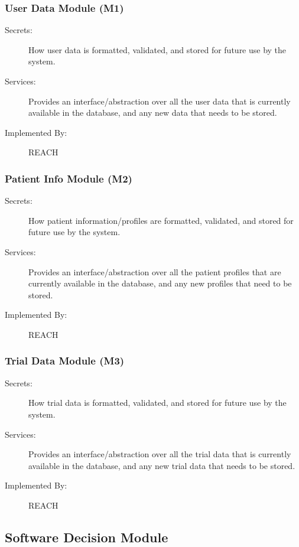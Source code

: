 \documentclass[12pt, titlepage]{article}
\begin{document}
\subsubsection{User Data Module (M1)}
\begin{description}
  \item[Secrets:] How user data is formatted, validated, and stored for future use by the system.
  \item[Services:] Provides an interface/abstraction over all the user data that is currently available in the database, and any new data that needs to be stored.
  \item[Implemented By:] REACH\\
\end{description}

\subsubsection{Patient Info Module (M2)}
\begin{description}
  \item[Secrets:] How patient information/profiles are formatted, validated, and stored for future use by the system.
  \item[Services:] Provides an interface/abstraction over all the patient profiles that are currently available in the database, and any new profiles that need to be stored.
  \item[Implemented By:] REACH\\
\end{description}

\subsubsection{Trial Data Module (M3)}
\begin{description}
  \item[Secrets:] How trial data is formatted, validated, and stored for future use by the system.
  \item[Services:] Provides an interface/abstraction over all the trial data that is currently available in the database, and any new trial data that needs to be stored.
  \item[Implemented By:] REACH\\
\end{description}

\subsection{Software Decision Module}
\end{document}
